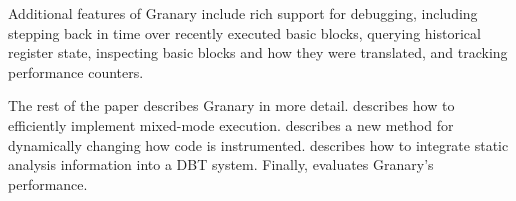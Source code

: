 \documentclass[preprint]{sigplanconf}
\begin{document}
%
%
%
%

Additional features of Granary include rich support for debugging, including stepping back in time over recently executed basic blocks, querying historical register state, inspecting basic blocks and how they were translated, and tracking performance counters.

The rest of the paper describes Granary in more detail.  describes how to efficiently implement mixed-mode execution.  describes a new method for dynamically changing how code is instrumented.  describes how to integrate static analysis information into a DBT system. Finally,  evaluates Granary's performance.
\end{document}

